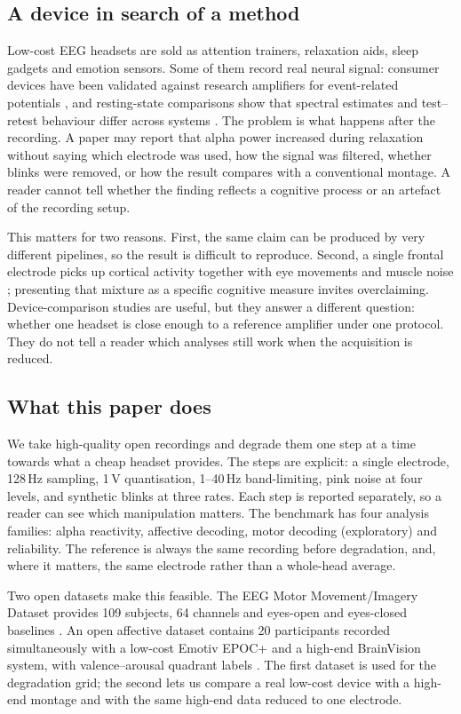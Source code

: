 \subsection*{A device in search of a method}
Low-cost EEG headsets are sold as attention trainers, relaxation aids, sleep gadgets and
emotion sensors. Some of them record real neural signal: consumer devices have been
validated against research amplifiers for event-related potentials
\citep{krigolson2017muse,badcock2015emotiv}, and resting-state comparisons show that
spectral estimates and test--retest behaviour differ across systems
\citep{ratti2017comparison,cannard2021muse}. The problem is what happens after the
recording. A paper may report that alpha power increased during relaxation without
saying which electrode was used, how the signal was filtered, whether blinks were
removed, or how the result compares with a conventional montage. A reader cannot tell
whether the finding reflects a cognitive process or an artefact of the recording setup.

This matters for two reasons. First, the same claim can be produced by very different
pipelines, so the result is difficult to reproduce. Second, a single frontal electrode
picks up cortical activity together with eye movements and muscle noise
\citep{whitham2007emg}; presenting that mixture as a specific cognitive measure invites
overclaiming. Device-comparison studies are useful, but they answer a different
question: whether one headset is close enough to a reference amplifier under one
protocol. They do not tell a reader which analyses still work when the acquisition is
reduced.

\subsection*{What this paper does}
We take high-quality open recordings and degrade them one step at a time towards what a
cheap headset provides. The steps are explicit: a single electrode, 128\,Hz sampling,
1\,\textmu V quantisation, 1--40\,Hz band-limiting, pink noise at four levels, and
synthetic blinks at three rates. Each step is reported separately, so a reader can see
which manipulation matters. The benchmark has four analysis families: alpha
reactivity, affective decoding, motor decoding (exploratory) and reliability. The
reference is always the same recording before degradation, and, where it matters, the
same electrode rather than a whole-head average.

Two open datasets make this feasible. The EEG Motor Movement/Imagery Dataset provides
109 subjects, 64 channels and eyes-open and eyes-closed baselines
\citep{schalk2009eegbci}. An open affective dataset contains 20 participants recorded
simultaneously with a low-cost Emotiv EPOC+ and a high-end BrainVision system, with
valence--arousal quadrant labels \citep{sanchezreolid2022emotion,sanchezreolid2025dataset}.
The first dataset is used for the degradation grid; the second lets us compare a real
low-cost device with a high-end montage and with the same high-end data reduced to one
electrode.

